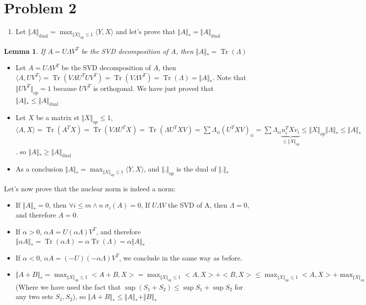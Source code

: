 \documentclass[11pt]{article}
\newcommand{\opnorm}[1]{\Vert #1 \Vert_{op}}
\newcommand{\nucnorm}[1]{\Vert #1 \Vert_*}
\newcommand{\tr}{\operatorname{Tr}}
\newtheorem{lemma}[theorem]{Lemma}
\begin{document}
\section{Problem 2}
\label{sec:orgheadline3}

\begin{enumerate}
\item Let  \(\Vert A\Vert _{\text{dual}} = \max_{\Vert X\Vert _{op} \le 1} \langle Y, X\rangle\) and let's prove that \(\Vert A\Vert _* = \Vert A\Vert _{\text{dual}}\)
\end{enumerate}
\begin{lemma}
If  \(A = U\Lambda V^T\) be the SVD decomposition of \(A\), then \(\nucnorm{A} = \tr(\Lambda)\)
\end{lemma}


\begin{itemize}
\item Let \(A = U\Lambda V^T\) be the SVD decomposition of \(A\), then \(\langle A, UV^T\rangle  = \tr(V \Lambda U^TUV^T) = \tr(V\Lambda V^T) = \tr(\Lambda) = \Vert A \Vert _*\). Note that \(\opnorm{UV^T} = 1\) because \(UV^T\) is orthogonal. We have just proved that  \(\Vert A\Vert _* \le \Vert A\Vert _{\text{dual}}\)
\end{itemize}


\begin{itemize}
\item Let \(X\) be a matrix st \(\opnorm{X} \le 1\), \(\langle A, X\rangle  = \tr(A^TX) = \tr(V \Lambda U^TX) = \tr(\Lambda U^TXV) = \sum \Lambda_{ii} (U^TXV)_{ii}  = \sum \Lambda_{ii} \underbrace{u_i^TXv_i}_{\le \Vert X\Vert _{op}} \le  \Vert X\Vert _{op} \Vert \Lambda\Vert _* \le \Vert A\Vert _*\). so  \(\Vert A\Vert _* \ge \Vert A\Vert _{\text{dual}}\)

\item As a conclusion \(\Vert A\Vert _* = \max_{\Vert X\Vert _{op} \le 1} \langle Y, X\rangle\), and \(\opnorm{.}\) is the dual of \(\nucnorm{.}\)
\end{itemize}


Let's now prove that the nuclear norm is indeed a norm:
\begin{itemize}
\item If \(\nucnorm{A} = 0\), then \(\forall i \le m \wedge n \; \sigma_i(A) = 0\), If \(U\Lambda V\) the SVD of A, then \(\Lambda = 0\), and therefore \(A = 0\).
\item If \(\alpha > 0\), \(\alpha A = U (\alpha \Lambda) V^T\), and therefore \(\nucnorm{\alpha A} = \tr(\alpha \Lambda) = \alpha \tr(\Lambda) = \alpha \nucnorm{A}\)
\item If \(\alpha < 0\), \(\alpha A  = (-U) (-\alpha \Lambda) V^T\), we conclude in the same way as before.
\item \(\nucnorm{A + B} = \max_{\opnorm{X} \le 1} <A + B, X> = \max_{\opnorm{X} \le 1} <A, X> + <B, X> \le  \max_{\opnorm{X} \le 1} <A, X> +  \max_{\opnorm{X} \le 1} <B, X>\) (Where we have used the fact that \(\sup(S_1+S_2) \le \sup S_1 + \sup S_2\) for any two sets \(S_1, S_2\)), so \(\nucnorm{A+B} \le \nucnorm{A} + \nucnorm{B}\)
\end{itemize}
\end{document}
